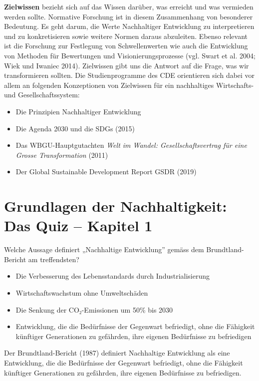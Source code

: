 \documentclass[
  nswissgerman,
  a4paper,
  DIV=11,
  numbers=noendperiod,
  oneside,
  openany]{scrreprt}
\providecommand{\tightlist}{%
  \setlength{\itemsep}{0pt}\setlength{\parskip}{0pt}}
\begin{document}
\textbf{Zielwissen} bezieht sich auf das Wissen darüber, was erreicht
und was vermieden werden sollte. Normative Forschung ist in diesem
Zusammenhang von besonderer Bedeutung. Es geht darum, die Werte
Nachhaltiger Entwicklung zu interpretieren und zu konkretisieren sowie
weitere Normen daraus abzuleiten. Ebenso relevant ist die Forschung zur
Festlegung von Schwellenwerten wie auch die Entwicklung von Methoden für
Bewertungen und Visionierungsprozesse (vgl. Swart et al. 2004; Wiek und
Iwaniec 2014). Zielwissen gibt uns die Antwort auf die Frage, was wir
transformieren sollten. Die Studienprogramme des CDE orientieren sich
dabei vor allem an folgenden Konzeptionen von Zielwissen für ein
nachhaltiges Wirtschafts- und Gesellschaftssystem:

\begin{itemize}
\tightlist
\item
  Die Prinzipien Nachhaltiger Entwicklung
\item
  Die Agenda 2030 und die SDGs (2015)
\item
  Das WBGU-Hauptgutachten \emph{Welt im Wandel: Gesellschaftsvertrag für
  eine Grosse Transformation} (2011)
\item
  Der Global Sustainable Development Report GSDR (2019)
\end{itemize}

\section{Grundlagen der Nachhaltigkeit: Das Quiz -- Kapitel
1}\label{grundlagen-der-nachhaltigkeit-das-quiz-kapitel-1}

Welche Aussage definiert „Nachhaltige Entwicklung'' gemäss dem
Brundtland-Bericht am treffendsten?

\begin{itemize}
\tightlist
\item[$\square$]
  Die Verbesserung des Lebensstandards durch Industrialisierung
\item[$\square$]
  Wirtschaftswachstum ohne Umweltschäden
\item[$\square$]
  Die Senkung der CO₂-Emissionen um 50\% bis 2030
\item[$\square$]
  Entwicklung, die die Bedürfnisse der Gegenwart befriedigt, ohne die
  Fähigkeit künftiger Generationen zu gefährden, ihre eigenen
  Bedürfnisse zu befriedigen
\end{itemize}

Der Brundtland-Bericht (1987) definiert Nachhaltige Entwicklung als eine
Entwicklung, die die Bedürfnisse der Gegenwart befriedigt, ohne die
Fähigkeit künftiger Generationen zu gefährden, ihre eigenen Bedürfnisse
zu befriedigen.
\end{document}
